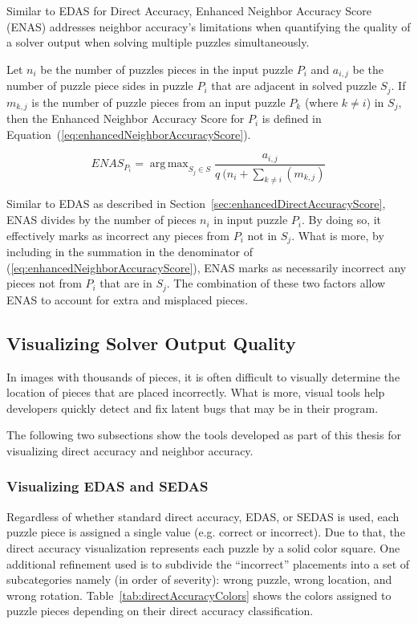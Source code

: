 \documentclass{report}
\def\eref#1{(\ref{#1})}
\DeclareMathOperator*{\argmax}{arg\,max} %
\begin{document}
Similar to EDAS for Direct Accuracy, Enhanced Neighbor Accuracy Score (ENAS) addresses neighbor accuracy's limitations when quantifying the quality of a solver output when solving multiple puzzles simultaneously. 

Let $n_i$ be the number of puzzles pieces in the input puzzle $P_i$ and $a_{i,j}$ be the number of puzzle piece sides in puzzle $P_i$ that are adjacent in solved puzzle $S_j$.  If $m_{k,j}$ is the number of puzzle pieces from an input puzzle $P_k$ (where $k \ne i$) in $S_j$, then the Enhanced Neighbor Accuracy Score for $P_i$ is defined in Equation~\eref{eq:enhancedNeighborAccuracyScore}.

\begin{equation} \label{eq:enhancedNeighborAccuracyScore}
ENAS_{P_i} = \argmax_{S_j \in S}\frac{a_{i,j}}{q ~ (n_i + \sum_{k \ne i}(m_{k,j})}
\end{equation}

Similar to EDAS as described in Section~\ref{sec:enhancedDirectAccuracyScore}, ENAS divides by the number of pieces $n_i$ in input puzzle $P_i$.  By doing so, it effectively marks as incorrect any pieces from $P_i$ not in $S_j$.  What is more, by including in the summation in the denominator of \eref{eq:enhancedNeighborAccuracyScore}, ENAS marks as necessarily incorrect any pieces not from $P_i$ that are in $S_j$.  The combination of these two factors allow ENAS to account for extra and misplaced pieces.

\subsection{Visualizing Solver Output Quality}\label{sec:visualizingSolverAccuracy}

In images with thousands of pieces, it is often difficult to visually determine the location of pieces that are placed incorrectly.  What is more, visual tools help developers quickly detect and fix latent bugs that may be in their program.

The following two subsections show the tools developed as part of this thesis for visualizing direct accuracy and neighbor accuracy.

\subsubsection{Visualizing EDAS and SEDAS}\label{sec:visualizingEdasSedas}

Regardless of whether standard direct accuracy, EDAS, or SEDAS is used, each puzzle piece is assigned a single value (e.g. correct or incorrect).  Due to that, the direct accuracy visualization represents each puzzle by a solid color square.  One additional refinement used is to subdivide the ``incorrect'' placements into a set of subcategories namely (in order of severity): wrong puzzle, wrong location, and wrong rotation.  Table~\ref{tab:directAccuracyColors} shows the colors assigned to puzzle pieces depending on their direct accuracy classification.
\end{document}
